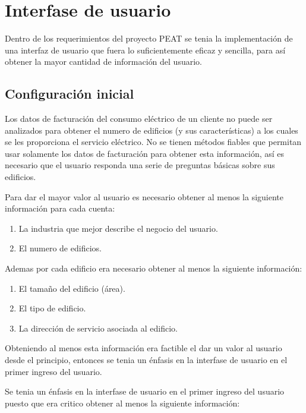 \section{Interfase de usuario}
Dentro de los requerimientos del proyecto PEAT se tenia la implementación de una
interfaz de usuario que fuera lo suficientemente eficaz y sencilla, para así obtener
la mayor cantidad de información del usuario.

\subsection{Configuración inicial}

Los datos de facturación del consumo eléctrico de un cliente no puede ser analizados
para obtener el numero de edificios (y sus características) a los cuales se les
proporciona el servicio eléctrico. No se tienen métodos fiables que permitan
usar solamente los datos de facturación para obtener esta información, así es
necesario que el usuario responda una serie de preguntas básicas sobre sus edificios.

Para dar el mayor valor al usuario es necesario obtener al menos la siguiente información
para cada cuenta:

\begin{enumerate}
\item La industria que mejor describe el negocio del usuario.
\item El numero de edificios.
\end{enumerate}

Ademas por cada edificio era necesario obtener al menos la siguiente información:

\begin{enumerate}
\item El tamaño del edificio (área).
\item El tipo de edificio.
\item La dirección de servicio asociada al edificio.
\end{enumerate}

Obteniendo al menos esta información era factible el dar un valor al usuario desde el
principio, entonces se tenia un énfasis en la interfase de usuario en el primer ingreso
del usuario.

Se tenia un énfasis en la interfase de usuario en el primer ingreso del usuario puesto
que era critico obtener al menos la siguiente información:

